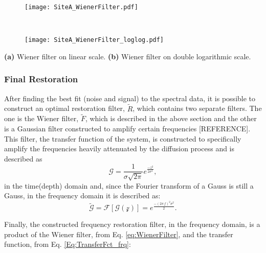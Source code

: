 \documentclass[../../CompleteThesis2/Complete_2ndDraft]{subfiles}
\begin{document}
\begin{marginfigure}
	\centering
	\begin{subfigure}{\marginparwidth}
		\centering
		\texttt{[image: SiteA\_WienerFilter.pdf]}
		\caption{\footnotesize}
		\label{fig:SiteA_WienerFilter}
	\end{subfigure}\\[1ex]
	
	\begin{subfigure}{\marginparwidth}
		\centering
		\texttt{[image: SiteA\_WienerFilter\_loglog.pdf]}
		\caption{\footnotesize}
		\label{fig:SiteA_WienerFilter_loglog}
	\end{subfigure}
	\caption[Wiener filter]{\footnotesize\textbf{(a)} Wiener filter on linear scale. \textbf{(b)} Wiener filter on double logarithmic scale.}
	\label{fig:SiteA_WienerFilters}
\end{marginfigure}

\subsubsection[Final Restoration][Final Restoration]{Final Restoration}
\label{Subsubsec:SignalAnalysis_BackDiffusion_FinalRestoration}

After finding the best fit (noise and signal) to the spectral data, it is possible to construct an optimal restoration filter, $\tilde{R}$, which contains two separate filters. The one is the Wiener filter, $\tilde{F}$, which is described in the above section and the other is a Gaussian filter constructed to amplify certain frequencies [REFERENCE]. This filter, the transfer function of the system, is constructed to specifically amplify the frequencies heavily attenuated by the diffusion process and is described as
\begin{equation}
	\mathcal{G} = \frac{1}{\sigma\sqrt{2\pi}} e^{\frac{-z^2}{2\sigma^2}},
	\label{Eq:TransferFct_z}
\end{equation}
in the time(depth) domain and, since the Fourier transform of a Gauss is still a Gauss, in the frequency domain it is described as:
\begin{equation}
	\tilde{\mathcal{G}} = \mathcal{F}[\mathcal{G(z)}] = e^{\frac{-(2\pi\, f)^2\sigma^2}{2}}.
	\label{Eq:TransferFct_frq}
\end{equation}

Finally, the constructed frequency restoration filter, in the frequency domain, is a product of the Wiener filter, from Eq. \ref{eq:WienerFilter}, and the transfer function, from Eq. \ref{Eq:TransferFct_frq}:
\end{document}
